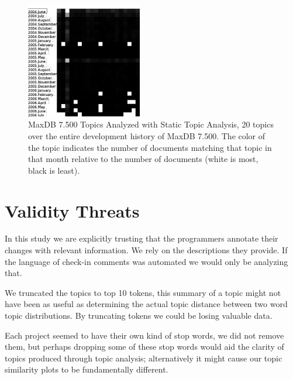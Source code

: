 \documentclass[times, 10pt,twocolumn]{article}
\begin{document}
\begin{figure}
  \centering
  \includegraphics[width=0.45\textwidth]{maxdb7500-everything-by-month}
  \caption{MaxDB 7.500 Topics Analyzed with Static Topic Analysis, 20
    topics over the entire development history of MaxDB 7.500. The
    color of the topic indicates the number of documents matching that
    topic in that month relative to the number of documents (white is
    most, black is least).}
  \label{fig:statictopics}
\end{figure}




\section{Validity Threats}

In this study we are explicitly trusting that the programmers annotate
their changes with relevant information. We rely on the descriptions
they provide. If the language of check-in comments was automated we
would only be analyzing that.

We truncated the topics to top 10 tokens, this summary of a topic
might not have been as useful as determining the actual topic distance
between two word topic distributions. By truncating tokens we could be
losing valuable data.

Each project seemed to have their own kind of stop words, we did not
remove them, but perhaps dropping some of these stop words would aid
the clarity of topics produced through topic analysis; alternatively
it might cause our topic similarity plots to be fundamentally
different.
\end{document}
